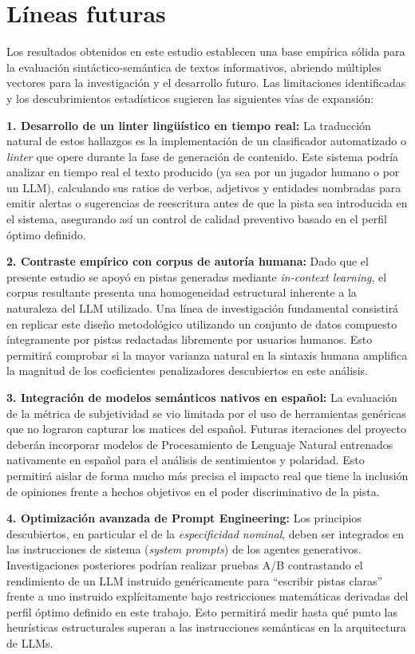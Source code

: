 \documentclass[../main.tex]{subfiles}
\begin{document}
\section{Líneas futuras}

Los resultados obtenidos en este estudio establecen una base empírica sólida para la evaluación sintáctico-semántica de textos informativos, abriendo múltiples vectores para la investigación y el desarrollo futuro. Las limitaciones identificadas y los descubrimientos estadísticos sugieren las siguientes vías de expansión:

\textbf{1. Desarrollo de un linter lingüístico en tiempo real:}
La traducción natural de estos hallazgos es la implementación de un clasificador automatizado o \textit{linter} que opere durante la fase de generación de contenido. Este sistema podría analizar en tiempo real el texto producido (ya sea por un jugador humano o por un LLM), calculando sus ratios de verbos, adjetivos y entidades nombradas para emitir alertas o sugerencias de reescritura antes de que la pista sea introducida en el sistema, asegurando así un control de calidad preventivo basado en el perfil óptimo definido.

\textbf{2. Contraste empírico con corpus de autoría humana:}
Dado que el presente estudio se apoyó en pistas generadas mediante \textit{in-context learning}, el corpus resultante presenta una homogeneidad estructural inherente a la naturaleza del LLM utilizado. Una línea de investigación fundamental consistirá en replicar este diseño metodológico utilizando un conjunto de datos compuesto íntegramente por pistas redactadas libremente por usuarios humanos. Esto permitirá comprobar si la mayor varianza natural en la sintaxis humana amplifica la magnitud de los coeficientes penalizadores descubiertos en este análisis.

\textbf{3. Integración de modelos semánticos nativos en español:}
La evaluación de la métrica de subjetividad se vio limitada por el uso de herramientas genéricas que no lograron capturar los matices del español. Futuras iteraciones del proyecto deberán incorporar modelos de Procesamiento de Lenguaje Natural entrenados nativamente en español para el análisis de sentimientos y polaridad. Esto permitirá aislar de forma mucho más precisa el impacto real que tiene la inclusión de opiniones frente a hechos objetivos en el poder discriminativo de la pista.

\textbf{4. Optimización avanzada de Prompt Engineering:}
Los principios descubiertos, en particular el de la \textit{especificidad nominal}, deben ser integrados en las instrucciones de sistema (\textit{system prompts}) de los agentes generativos. Investigaciones posteriores podrían realizar pruebas A/B contrastando el rendimiento de un LLM instruido genéricamente para ``escribir pistas claras'' frente a uno instruido explícitamente bajo restricciones matemáticas derivadas del perfil óptimo definido en este trabajo. Esto permitirá medir hasta qué punto las heurísticas estructurales superan a las instrucciones semánticas en la arquitectura de LLMs.
\end{document}
